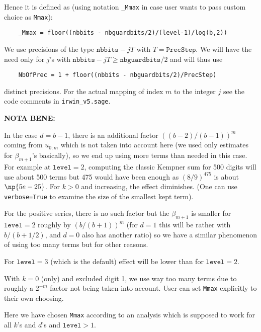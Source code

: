 \documentclass[a4paper,french,dvipdfmx,11pt]{article}
\begin{document}
Hence it is defined as (using notation \verb+_Mmax+ in case user wants to pass
custom choice as \texttt{Mmax}):
\begin{verbatim}
    _Mmax = floor((nbbits - nbguardbits/2)/(level-1)/log(b,2))
\end{verbatim}

We use precisions of the type $\mathtt{nbbits} - j T$ with $T =
\mathtt{PrecStep}$.  We will have the need only for $j$'s with $\mathtt{nbbits}
-jT \geq \mathtt{nbguardbits}/2$ and will thus use
\begin{verbatim}
    NbOfPrec = 1 + floor((nbbits - nbguardbits/2)/PrecStep)
\end{verbatim}
distinct precisions.  For the actual mapping of index $m$ to the integer $j$
see the code comments in \texttt{irwin\_v5.sage}.


\textbf{NOTA BENE:}

In the case $d=b-1$, there is an additional factor $((b-2)/(b-1))^m$ coming
from $u_{0;m}$ which is not taken into account here (we used only estimates
for $\beta_{m+1}$'s basically), so we end up using more terms than needed in
this case.  For example at $\mathtt{level} = 2$, computing the classic Kempner
sum for 500 digits will use about 500 terms but 475 would have been enough as
$(8/9)^{475}$ is about $\np{5e-25}$.  For $k>0$ and increasing, the effect
diminishes.  (One can use \texttt{verbose=True} to examine the size of the
smallest kept term).

               For the positive series, there is no such factor
               but the $\beta_{m+1}$ is smaller for $\mathtt{level}=2$ roughly
               by $(b/(b+1))^m$ (for $d=1$ this will be rather with
               $b/(b+1/2)$, and $d=0$ also has another ratio) so we
               have a similar phenomenon of using too many terms
               but for other reasons.

               For $\mathtt{level}=3$ (which is the default) effect will be
               lower than for $\mathtt{level}=2$.

               With $k=0$ (only) and excluded digit 1, we use way
               too many terms due to roughly a $2^{-m}$ factor not
               being taken into account.  User can set \texttt{Mmax}
               explicitly to their own choosing.

               Here we have chosen \texttt{Mmax} according to an analysis
               which is supposed to work for all $k$'s and $d$'s
               and $\mathtt{level}>1$.
\end{document}
